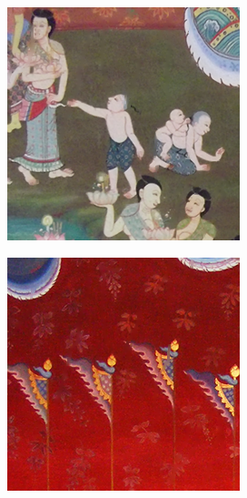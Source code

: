 \documentclass[xcolor=dvipsnames, xetex,serif]{beamer}
\numberwithin{equation}{section}
\begin{document}
\begin{frame}
\begin{figure}[H]
\begin{subfigure}{0.15\linewidth}
            \end{subfigure}
            \begin{subfigure}{0.15\linewidth}
                \centering
                \includegraphics[width=0.9\linewidth]{images/result_ex4/multisplitbergman_case02.png}
            \end{subfigure}
            \begin{subfigure}{0.15\linewidth}
                \centering
                \includegraphics[width=0.9\linewidth]{images/result_ex4/multisplitbergman_case03.png}			

\end{subfigure}
\end{figure}
\end{frame}
\end{document}
